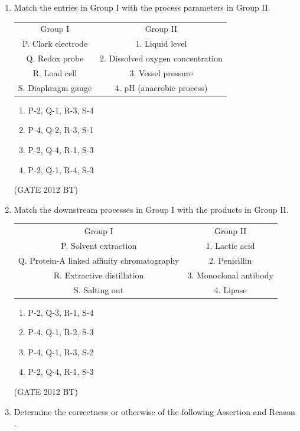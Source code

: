 \documentclass[journal,12pt,onecolumn]{IEEEtran}
\theoremstyle{remark}
\begin{document}
\begin{enumerate}
\item Match the entries in Group I with the process parameters in Group II.\\
  \begin{tabular}{c c}
    Group I&	Group II\\
P.	Clark electrode &	1.	Liquid level\\
Q.	Redox probe	& 2.	Dissolved oxygen concentration\\
R.	Load cell	& 3.	Vessel pressure\\
S.	Diaphragm gauge	&4.	pH (anaerobic process)\\
\end{tabular}
\begin{multicols}{2}
\begin{enumerate}
\item P-2, Q-1, R-3, S-4	
\item  P-4, Q-2, R-3, S-1
\item  P-2, Q-4, R-1, S-3
\item  P-2, Q-1, R-4, S-3
\end{enumerate}
\end{multicols} \hfill(GATE 2012 BT)


\item 	Match the downstream processes in Group I with the products in Group II.\\

 \begin{tabular}{c c}
    Group I&	Group II\\
P.	Solvent extraction	&1.	Lactic acid\\
Q.	Protein-A linked affinity chromatography&	2.	Penicillin\\
R.	Extractive distillation	&3.	Monoclonal antibody\\
S.	Salting out	&4.	Lipase
\end{tabular}
\begin{multicols}{2}
\begin{enumerate}
\item P-2, Q-3, R-1, S-4	
\item P-4, Q-1, R-2, S-3
\item P-4, Q-1, R-3, S-2
\item P-2, Q-4, R-1, S-3
\end{enumerate}
\end{multicols} \hfill(GATE 2012 BT)

\item Determine the correctness or otherwise of the following Assertion  and Reason .\\


\end{enumerate}
\end{document}
